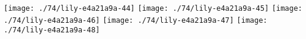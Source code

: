 \fi
\texttt{[image: ./74/lily-e4a21a9a-44]}%
\ifx\betweenLilyPondSystem \undefined
  \linebreak
\else
  \expandafter{}%
\fi
\texttt{[image: ./74/lily-e4a21a9a-45]}%
\ifx\betweenLilyPondSystem \undefined
  \linebreak
\else
  \expandafter{}%
\fi
\texttt{[image: ./74/lily-e4a21a9a-46]}%
\ifx\betweenLilyPondSystem \undefined
  \linebreak
\else
  \expandafter{}%
\fi
\texttt{[image: ./74/lily-e4a21a9a-47]}%
\ifx\betweenLilyPondSystem \undefined
  \linebreak
\else
  \expandafter{}%
\fi
\texttt{[image: ./74/lily-e4a21a9a-48]}%
